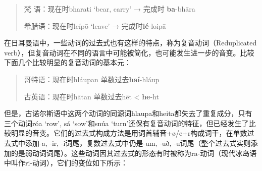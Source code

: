 \begin{quote}
  梵 语：现在时bharati `bear, carry' → 完成时 \textbf{ba}-bhāra

  希腊语：现在时leípō `leave' → 完成时\textbf{lé}-loipā
\end{quote}

在日耳曼语中，一些动词的过去式也有这样的特点，称为复音动词（Reduplicated
verb），但复音动词在不同的语言中可能被简化，也可能发生进一步的音变。比较下面几个比较明显的复音动词的基本元：

\begin{quote}
  哥特语：现在时hláupan 单数过去\textbf{haí}-hláup

  古英语：现在时hātan 单数过去hēt \textless{} \textbf{he}-ht
\end{quote}

但是，古诺尔斯语中这两个动词的同源词hlaupa和heita都失去了重复成分，只有三个动词róa
`row‌', sá `sow‌'和snúa
`turn‌'还保有复音动词的特征，但已经发生了比较明显的音变。它们的过去式构成方法是用词首辅音+ø/e+r构成词干，在单数过去式中添加-a,
-ir, -i词尾，复数过去式中仍是-um, -uð,
-u词尾（整个过去式实则添加的是弱动词词尾）。这些动词因其过去式的形态有时被称为ra-动词（现代冰岛语中叫作ri-动词），它们的变位如下所示：

